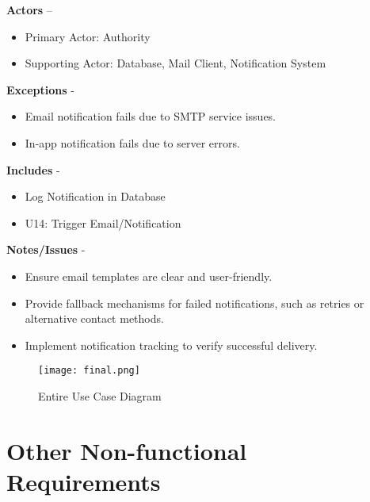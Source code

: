 \documentclass[a4paper,12pt]{article}
\begin{document}
\textbf{Actors} – 
\begin{itemize} 
    \item Primary Actor: Authority
    \item Supporting Actor: Database, Mail Client, Notification System
\end{itemize}
\textbf{Exceptions} - 
\begin{itemize} 
    \item Email notification fails due to SMTP service issues.
    \item In-app notification fails due to server errors.
\end{itemize}
\textbf{Includes} - 
\begin{itemize} 
    \item Log Notification in Database
    \item U14: Trigger Email/Notification
\end{itemize}
\textbf{Notes/Issues} - 
\begin{itemize} 
    \item Ensure email templates are clear and user-friendly.
    \item Provide fallback mechanisms for failed notifications, such as retries or alternative contact methods.
    \item Implement notification tracking to verify successful delivery.
\end{itemize}
\begin{figure}[h!]
    \centering
    \texttt{[image: final.png]}
    \caption{Entire Use Case Diagram}
    \label{Figure 4: Entire Use Case Diagram}
\end{figure}

\clearpage

\section{Other Non-functional Requirements} \label{sec:nonfunctional}
\end{document}
